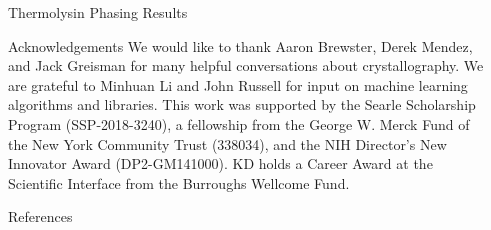 \documentclass[final]{beamer}
\newlength{\sepwidth}
\newlength{\colwidth}
\newcommand{\separatorcolumn}{\begin{column}{\sepwidth}\end{column}}
\begin{document}
\begin{frame}[t]
\begin{columns}[t]
\begin{column}{\colwidth}
\begin{block}{Thermolysin Phasing Results}
  \end{block}
  



  \begin{block}{Acknowledgements}
  We would like to thank Aaron Brewster, Derek Mendez, and Jack Greisman for many helpful conversations about crystallography. 
  We are grateful to Minhuan Li and John Russell for input on machine learning algorithms and libraries. 
  This work was supported by the Searle Scholarship Program (SSP-2018-3240), a fellowship from the George W. Merck Fund of the New York Community Trust (338034), and the NIH Director's New Innovator Award (DP2-GM141000).
  KD holds a Career Award at the Scientific Interface from the Burroughs Wellcome Fund. 
  
  \end{block}
  
  \begin{block}{References}

  \printbibliography

  \end{block}

\end{column}

\separatorcolumn
\end{columns}
\end{frame}
\end{document}

